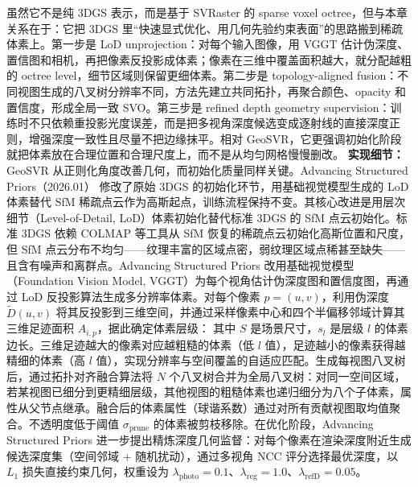 虽然它不是纯 3DGS 表示，而是基于 SVRaster 的 sparse voxel octree，但与本章关系在于：它把 3DGS 里“快速显式优化、用几何先验约束表面”的思路搬到稀疏体素上。第一步是 LoD unprojection：对每个输入图像，用 VGGT 估计伪深度、置信图和相机，再把像素反投影成体素；像素在三维中覆盖面积越大，就分配越粗的 octree level，细节区域则保留更细体素。第二步是 topology-aligned fusion：不同视图生成的八叉树分辨率不同，方法先建立共同拓扑，再聚合颜色、opacity 和置信度，形成全局一致 SVO。第三步是 refined depth geometry supervision：训练时不只依赖重投影光度误差，而是把多视角深度候选变成逐射线的直接深度正则，增强深度一致性且尽量不把边缘抹平。相对 GeoSVR，它更强调初始化阶段就把体素放在合理位置和合理尺度上，而不是从均匀网格慢慢删改。
\textbf{实现细节：} GeoSVR 从正则化角度改善几何，而初始化质量同样关键。Advancing Structured Priors（2026.01） 修改了原始 3DGS 的初始化环节，用基础视觉模型生成的 LoD 体素替代 SfM 稀疏点云作为高斯起点，训练流程保持不变。其核心改进是用层次细节（Level-of-Detail, LoD）体素初始化替代标准 3DGS 的 SfM 点云初始化。标准 3DGS 依赖 COLMAP 等工具从 SfM 恢复的稀疏点云初始化高斯位置和尺度，但 SfM 点云分布不均匀——纹理丰富的区域点密，弱纹理区域点稀甚至缺失——且含有噪声和离群点。Advancing Structured Priors 改用基础视觉模型（Foundation Vision Model, VGGT）为每个视角估计伪深度图和置信度图，再通过 LoD 反投影算法生成多分辨率体素。对每个像素 $p=(u,v)$，利用伪深度 $\tilde{D}(u,v)$ 将其反投影到三维空间，并通过采样像素中心和四个半偏移邻域计算其三维足迹面积 $A_{i,p}$，据此确定体素层级： 其中 $S$ 是场景尺寸，$s_l$ 是层级 $l$ 的体素边长。三维足迹越大的像素对应越粗糙的体素（低 $l$ 值），足迹越小的像素获得越精细的体素（高 $l$ 值），实现分辨率与空间覆盖的自适应匹配。生成每视图八叉树后，通过拓扑对齐融合算法将 $N$ 个八叉树合并为全局八叉树：对同一空间区域，若某视图已细分到更精细层级，其他视图的粗糙体素也递归细分为八个子体素，属性从父节点继承。融合后的体素属性（球谐系数）通过对所有贡献视图取均值聚合。不透明度低于阈值 $\sigma_{\mathrm{prune}}$ 的体素被剪枝移除。在优化阶段，Advancing Structured Priors 进一步提出精炼深度几何监督：对每个像素在渲染深度附近生成候选深度集（空间邻域 + 随机扰动），通过多视角 NCC 评分选择最优深度，以 $L_1$ 损失直接约束几何，权重设为 $\lambda_{\mathrm{photo}} = 0.1$、$\lambda_{\mathrm{reg}} = 1.0$、$\lambda_{\mathrm{refD}} = 0.05$。

